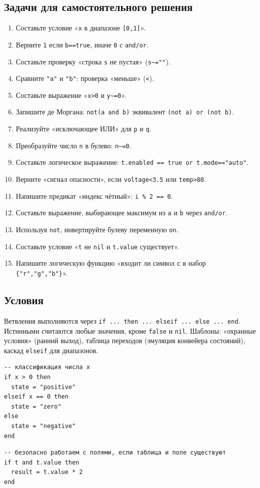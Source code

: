 \subsection*{Задачи для самостоятельного решения}
\begin{enumerate}
  \item Составьте условие «\verb|x| в диапазоне \verb|[0,1]|».
  \item Верните \verb|1| если \verb|b==true|, иначе \verb|0| с \verb|and/or|.
  \item Составьте проверку «строка \verb|s| не пустая» (\verb|s~=""|).
  \item Сравните \verb|"a"| и \verb|"b"|: проверка «меньше» (\verb|<|).
  \item Составьте выражение «\verb|x>0| и \verb|y~=0|».
  \item Запишите де Моргана: \verb|not(a and b)| эквивалент \verb|(not a) or (not b)|.
  \item Реализуйте «исключающее ИЛИ» для \verb|p| и \verb|q|.
  \item Преобразуйте число \verb|n| в булево: \verb|n~=0|.
  \item Составьте логическое выражение: \verb|t.enabled == true or t.mode=="auto"|.
  \item Верните «сигнал опасности», если \verb|voltage<3.5| или \verb|temp>80|.
  \item Напишите предикат «индекс чётный»: \verb|i % 2 == 0|.
  \item Составьте выражение, выбирающее максимум из \verb|a| и \verb|b| через \verb|and/or|.
  \item Используя \verb|not|, инвертируйте булеву переменную \verb|on|.
  \item Составьте условие «\verb|t| не \verb|nil| и \verb|t.value| существует».
  \item Напишите логическую функцию «входит ли символ \verb|c| в набор \verb|{"r","g","b"}|».
\end{enumerate}

\subsection{Условия}
Ветвления выполняются через \verb|if ... then ... elseif ... else ... end|. Истинными считаются любые значения, кроме \verb|false| и \verb|nil|. Шаблоны: «охранные условия» (ранний выход), таблица переходов (эмуляция конвейера состояний), каскад \verb|elseif| для диапазонов.
\begin{verbatim}
-- классификация числа x
if x > 0 then
  state = "positive"
elseif x == 0 then
  state = "zero"
else
  state = "negative"
end
\end{verbatim}
\begin{verbatim}
-- безопасно работаем с полями, если таблица и поле существуют
if t and t.value then
  result = t.value * 2
end
\end{verbatim}
